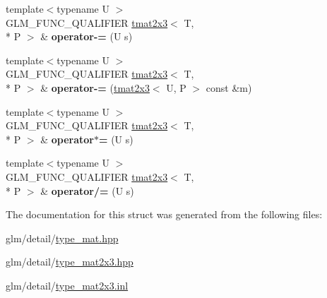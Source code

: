 \begin{DoxyCompactItemize}
\item 
\hypertarget{structglm_1_1tmat2x3_ab20c10a9eacf4c5ba7c68b08d0421b76}{{\footnotesize template$<$typename U $>$ }\\G\-L\-M\-\_\-\-F\-U\-N\-C\-\_\-\-Q\-U\-A\-L\-I\-F\-I\-E\-R \hyperlink{structglm_1_1tmat2x3}{tmat2x3}$<$ T, \\*
P $>$ \& {\bfseries operator-\/=} (U s)}\label{structglm_1_1tmat2x3_ab20c10a9eacf4c5ba7c68b08d0421b76}

\item 
\hypertarget{structglm_1_1tmat2x3_a7c726274f83d7577f62b165eafbb0510}{{\footnotesize template$<$typename U $>$ }\\G\-L\-M\-\_\-\-F\-U\-N\-C\-\_\-\-Q\-U\-A\-L\-I\-F\-I\-E\-R \hyperlink{structglm_1_1tmat2x3}{tmat2x3}$<$ T, \\*
P $>$ \& {\bfseries operator-\/=} (\hyperlink{structglm_1_1tmat2x3}{tmat2x3}$<$ U, P $>$ const \&m)}\label{structglm_1_1tmat2x3_a7c726274f83d7577f62b165eafbb0510}

\item 
\hypertarget{structglm_1_1tmat2x3_a3301a48c44c671556109b4cbf37daf81}{{\footnotesize template$<$typename U $>$ }\\G\-L\-M\-\_\-\-F\-U\-N\-C\-\_\-\-Q\-U\-A\-L\-I\-F\-I\-E\-R \hyperlink{structglm_1_1tmat2x3}{tmat2x3}$<$ T, \\*
P $>$ \& {\bfseries operator$\ast$=} (U s)}\label{structglm_1_1tmat2x3_a3301a48c44c671556109b4cbf37daf81}

\item 
\hypertarget{structglm_1_1tmat2x3_aeb03b749f9cc0705bac20e5c76c7d9d0}{{\footnotesize template$<$typename U $>$ }\\G\-L\-M\-\_\-\-F\-U\-N\-C\-\_\-\-Q\-U\-A\-L\-I\-F\-I\-E\-R \hyperlink{structglm_1_1tmat2x3}{tmat2x3}$<$ T, \\*
P $>$ \& {\bfseries operator/=} (U s)}\label{structglm_1_1tmat2x3_aeb03b749f9cc0705bac20e5c76c7d9d0}

\end{DoxyCompactItemize}


The documentation for this struct was generated from the following files\-:\begin{DoxyCompactItemize}
\item 
glm/detail/\hyperlink{type__mat_8hpp}{type\-\_\-mat.\-hpp}\item 
glm/detail/\hyperlink{type__mat2x3_8hpp}{type\-\_\-mat2x3.\-hpp}\item 
glm/detail/\hyperlink{type__mat2x3_8inl}{type\-\_\-mat2x3.\-inl}\end{DoxyCompactItemize}
